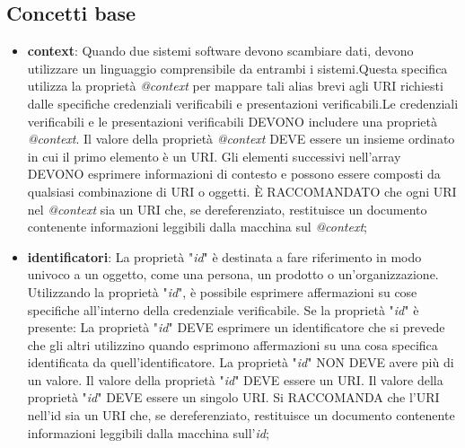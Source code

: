 \subsection{Concetti base}
\begin{itemize}
\item \textbf{context}: Quando due sistemi software devono scambiare dati, devono utilizzare un linguaggio comprensibile da entrambi i sistemi.Questa specifica utilizza la proprietà \textit{@context}  per mappare tali alias brevi agli URI richiesti dalle specifiche credenziali verificabili e presentazioni verificabili.Le credenziali verificabili e le presentazioni verificabili 
DEVONO includere una proprietà \textit{@context}. Il valore della proprietà \textit{@context} DEVE essere un insieme ordinato in cui il primo elemento è un URI. Gli elementi successivi nell'array DEVONO esprimere informazioni di contesto e possono essere composti da qualsiasi combinazione di 
URI o oggetti. È RACCOMANDATO che ogni URI nel \textit{@context} sia un URI che, se dereferenziato, restituisce un documento contenente informazioni leggibili dalla macchina sul \textit{@context};

\item \textbf{identificatori}: La proprietà "\textit{id}" è destinata a fare riferimento in modo univoco a un oggetto, come una persona, un prodotto o un'organizzazione. Utilizzando la proprietà "\textit{id}", 
è possibile esprimere affermazioni su cose specifiche all'interno della credenziale verificabile.
Se la proprietà "\textit{id}" è presente:
La proprietà "\textit{id}" DEVE esprimere un identificatore che si prevede che gli altri utilizzino quando esprimono affermazioni su una cosa specifica identificata da quell'identificatore.
La proprietà "\textit{id}" NON DEVE avere più di un valore.
Il valore della proprietà "\textit{id}" DEVE essere un URI.
Il valore della proprietà "\textit{id}" DEVE essere un singolo URI. Si RACCOMANDA che l'URI nell'id sia un URI che, se dereferenziato, restituisce un documento contenente informazioni 
leggibili dalla macchina sull'\textit{id};


\end{itemize}
